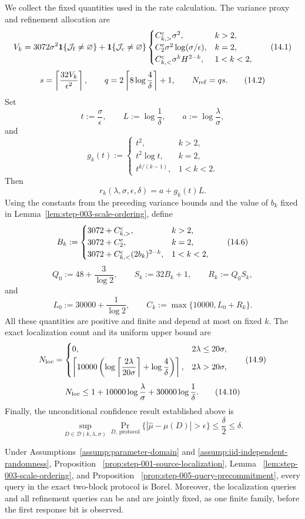 We collect the fixed quantities used in the rate calculation.  The variance
proxy and refinement allocation are
\[
V_k
=3072\sigma^2\mathbf 1\{\mathcal J_{\rm f}\neq\varnothing\}
+\mathbf 1\{\mathcal J_{\rm c}\neq\varnothing\}
\begin{cases}
C_{k,>}^{\rm c}\sigma^2,&k>2,\\
C_2^{\rm c}\sigma^2\log(\sigma/\epsilon),&k=2,\\
C_{k,<}^{\rm c}\sigma^kH^{2-k},&1<k<2,
\end{cases}
\tag{14.1}
\]
\[
s=\left\lceil\frac{32V_k}{\epsilon^2}\right\rceil,
\qquad
q=2\left\lceil8\log\frac4\delta\right\rceil+1,
\qquad
N_{\rm ref}=qs.
\tag{14.2}
\]
Set
\[
t:=\frac{\sigma}{\epsilon},
\qquad
L:=\log\frac1\delta,
\qquad
a:=\log\frac{\lambda}{\sigma},
\tag{14.3}
\]
and
\[
g_k(t):=
\begin{cases}
t^2,&k>2,\\
t^2\log t,&k=2,\\
t^{k/(k-1)},&1<k<2.
\end{cases}
\tag{14.4}
\]
Then
\[
r_k(\lambda,\sigma,\epsilon,\delta)=a+g_k(t)L.
\tag{14.5}
\]
Using the constants from the preceding variance bounds and the value of
\(b_k\) fixed in Lemma~\ref{lem:step-003-scale-ordering}, define
\[
B_k:=
\begin{cases}
3072+C_{k,>}^{\rm c},&k>2,\\
3072+C_2^{\rm c},&k=2,\\
3072+C_{k,<}^{\rm c}(2b_k)^{2-k},&1<k<2,
\end{cases}
\tag{14.6}
\]
\[
Q_0:=48+\frac3{\log2},
\qquad
S_k:=32B_k+1,
\qquad
R_k:=Q_0S_k,
\tag{14.7}
\]
and
\[
L_0:=30000+\frac1{\log2},
\qquad
C_k:=\max\{10000,L_0+R_k\}.
\tag{14.8}
\]
All these quantities are positive and finite and depend at most on fixed
\(k\).  The exact localization count and its uniform upper bound are
\[
N_{\rm loc}=
\begin{cases}
0,&2\lambda\leq20\sigma,\\[0.3em]
\left\lceil10000\left(
\log\left\lceil\dfrac{2\lambda}{20\sigma}\right\rceil
+\log\dfrac4\delta\right)\right\rceil,
&2\lambda>20\sigma,
\end{cases}
\tag{14.9}
\]
\[
N_{\rm loc}
\leq1+10000\log\frac\lambda\sigma
+30000\log\frac1\delta.
\tag{14.10}
\]
Finally, the unconditional confidence result established above is
\[
\sup_{D\in\mathcal D(k,\lambda,\sigma)}
\Pr_{D,\,\mathrm{protocol}}
\{|\widehat\mu-\mu(D)|>\epsilon\}
\leq\frac\delta2\leq\delta.
\tag{14.11}
\]

\begin{proposition}\label{prop:step-014-simultaneous-precommitment}
Under Assumptions~\ref{assump:parameter-domain} and
\ref{assump:iid-independent-randomness}, Proposition~
\ref{prop:step-001-source-localization}, Lemma~
\ref{lem:step-003-scale-ordering}, and Proposition~
\ref{prop:step-005-query-precommitment}, every query in the exact two-block
protocol is Borel. Moreover, the localization queries
and all refinement queries can be and are jointly fixed, as one finite
family, before the first response bit is observed.
\end{proposition}

